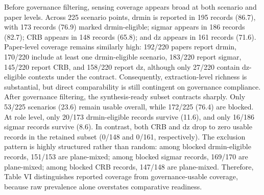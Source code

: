 {}\markdownRendererInterblockSeparator
{}Before governance filtering, sensing coverage appears broad at both scenario and paper levels. Across 225 scenario points, drmin is reported in 195 records (86.7\markdownRendererPercentSign{}), with 173 records (76.9\markdownRendererPercentSign{}) marked drmin-eligible; sigma\markdownRendererUnderscore{}r appears in 186 records (82.7\markdownRendererPercentSign{}); CRB appears in 148 records (65.8\markdownRendererPercentSign{}); and dz appears in 161 records (71.6\markdownRendererPercentSign{}). Paper-level coverage remains similarly high: 192/220 papers report drmin, 170/220 include at least one drmin-eligible scenario, 183/220 report sigma\markdownRendererUnderscore{}r, 145/220 report CRB, and 158/220 report dz, although only 27/220 contain dz-eligible contexts under the contract. Consequently, extraction-level richness is substantial, but direct comparability is still contingent on governance compliance.\markdownRendererParagraphSeparator
{}After governance filtering, the synthesis-ready subset contracts sharply. Only 53/225 scenarios (23.6\markdownRendererPercentSign{}) remain usable overall, while 172/225 (76.4\markdownRendererPercentSign{}) are blocked. At role level, only 20/173 drmin-eligible records survive (11.6\markdownRendererPercentSign{}), and only 16/186 sigma\markdownRendererUnderscore{}r records survive (8.6\markdownRendererPercentSign{}). In contrast, both CRB and dz drop to zero usable records in the retained subset (0/148 and 0/161, respectively). The exclusion pattern is highly structured rather than random: among blocked drmin-eligible records, 151/153 are plane-mixed; among blocked sigma\markdownRendererUnderscore{}r records, 169/170 are plane-mixed; among blocked CRB records, 147/148 are plane-mixed. Therefore, Table VI distinguishes reported coverage from governance-usable coverage, because raw prevalence alone overstates comparative readiness.\markdownRendererParagraphSeparator
